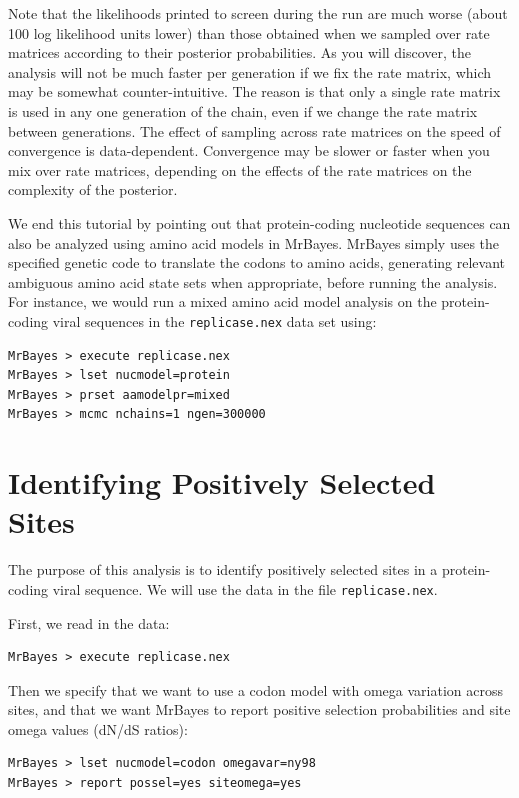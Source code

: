 \documentclass[12pt]{book}
\begin{document}
Note that the likelihoods printed to screen during the run are much worse (about 100 log likelihood
units lower) than those obtained when we sampled over rate matrices according to their posterior
probabilities. As you will discover, the analysis will not be much faster per generation if we fix
the rate matrix, which may be somewhat counter-intuitive. The reason is that only a single rate
matrix is used in any one generation of the chain, even if we change the rate matrix between
generations. The effect of sampling across rate matrices on the speed of convergence is
data-dependent. Convergence may be slower or faster when you mix over rate matrices, depending on
the effects of the rate matrices on the complexity of the posterior.

We end this tutorial by pointing out that protein-coding nucleotide sequences can also be analyzed
using amino acid models in MrBayes. MrBayes simply uses the specified genetic code to translate the
codons to amino acids, generating relevant ambiguous amino acid state sets when appropriate, before
running the analysis. For instance, we would run a mixed amino acid model analysis on the
protein-coding viral sequences in the \texttt{replicase.nex} data set using:

\begin{Verbatim}
MrBayes > execute replicase.nex
MrBayes > lset nucmodel=protein
MrBayes > prset aamodelpr=mixed
MrBayes > mcmc nchains=1 ngen=300000
\end{Verbatim}

\section{Identifying Positively Selected Sites}

The purpose of this analysis is to identify positively selected sites in a protein-coding viral
sequence. We will use the data in the file \texttt{replicase.nex}.

First, we read in the data:

\begin{Verbatim}
MrBayes > execute replicase.nex
\end{Verbatim}

Then we specify that we want to use a codon model with omega variation across sites, and that we
want MrBayes to report positive selection probabilities and site omega values (dN/dS ratios):

\begin{Verbatim}
MrBayes > lset nucmodel=codon omegavar=ny98
MrBayes > report possel=yes siteomega=yes
\end{Verbatim}
\end{document}

